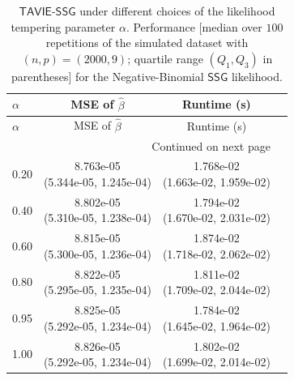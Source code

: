 \documentclass[12pt]{article}
\numberwithin{equation}{section}
\newcommand{\ssg}{\mathsf{SSG}}
\newcommand{\tssg}{\mathsf{TAVIE}\text{-}\mathsf{SSG}}
\begin{document}
{\scriptsize
\setlength{\tabcolsep}{6pt} %
\renewcommand{\arraystretch}{1.15}%
\begin{longtable}{lccc}
\caption{\footnotesize{$\tssg$ under different choices of the likelihood tempering parameter $\alpha$. Performance [median over $100$ repetitions of the simulated dataset with $(n, p) = (2000, 9)$; quartile range $(Q_1, Q_3)$ in parentheses] for the Negative-Binomial $\ssg$ likelihood.}} \label{tab:NegBin-different-alpha}\\
\toprule
\toprule
$\alpha$ & MSE of $\widehat{\beta}$ & Runtime (s) \\
\midrule
\endfirsthead

\toprule
$\alpha$ & MSE of $\widehat{\beta}$ & Runtime (s) \\
\midrule
\endhead

\midrule
\multicolumn{3}{r}{Continued on next page} \\
\midrule
\endfoot

\bottomrule
\bottomrule
\endlastfoot

0.20 &
  \makecell[c]{8.763e-05\\(5.344e-05, 1.245e-04)} &
  \makecell[c]{1.768e-02\\(1.663e-02, 1.959e-02)} \\

0.40 &
  \makecell[c]{8.802e-05\\(5.310e-05, 1.238e-04)} &
  \makecell[c]{1.794e-02\\(1.670e-02, 2.031e-02)} \\

0.60 &
  \makecell[c]{8.815e-05\\(5.300e-05, 1.236e-04)} &
  \makecell[c]{1.874e-02\\(1.718e-02, 2.062e-02)} \\

0.80 &
  \makecell[c]{8.822e-05\\(5.295e-05, 1.235e-04)} &
  \makecell[c]{1.811e-02\\(1.709e-02, 2.044e-02)} \\

0.95 &
  \makecell[c]{8.825e-05\\(5.292e-05, 1.234e-04)} &
  \makecell[c]{1.784e-02\\(1.645e-02, 1.964e-02)} \\

1.00 &
  \makecell[c]{8.826e-05\\(5.292e-05, 1.234e-04)} &
  \makecell[c]{1.802e-02\\(1.699e-02, 2.014e-02)} \\

\end{longtable}
}
\end{document}
